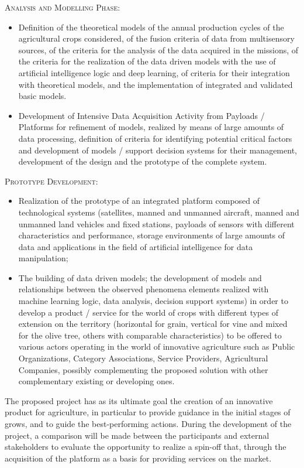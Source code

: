 \documentclass[comsoc,final]{IEEEtran}
\begin{document}
\textsc{Analysis and Modelling Phase:}

\begin{itemize}
\item Definition of the theoretical models of the annual production cycles of the agricultural crops considered, of the fusion criteria of data from multisensory sources, of the criteria for the analysis of the data acquired in the missions, of the criteria for the realization of the data driven models with the use of artificial intelligence logic and deep learning, of criteria for their integration with theoretical models, and the implementation of integrated and validated basic models.
\item Development of Intensive Data Acquisition Activity from Payloads / Platforms for refinement of models, realized by means of large amounts of data processing, definition of criteria for identifying potential critical factors and development of models / support decision systems for their management, development of the design and the prototype of the complete system.
\end{itemize}

\textsc{Prototype Development:}

\begin{itemize}
\item Realization of the prototype of an integrated platform composed of technological systems (satellites, manned and unmanned aircraft, manned and unmanned land vehicles and fixed stations, payloads of sensors with different characteristics and performance, storage environments of large amounts of data and applications in the field of artificial intelligence for data manipulation;
\item The building of data driven models; the development of models and relationships between the observed phenomena elements realized with machine learning logic, data analysis, decision support systems) in order to develop a product / service for the world of crops with different types of extension on the territory (horizontal for grain, vertical for vine and mixed for the olive tree, others with comparable characteristics) to be offered to various actors operating in the world of innovative agriculture such as Public Organizations, Category Associations, Service Providers, Agricultural Companies, possibly complementing the proposed solution with other complementary existing or developing ones.
\end{itemize}

The proposed project has as its ultimate goal the creation of an innovative product for agriculture, in particular to provide guidance in the initial stages of grows, and to guide the best-performing actions. 
During the development of the project, a comparison will be made between the participants and external stakeholders to evaluate the opportunity to realize a spin-off that, through the acquisition of the platform as a basis for providing services on the market.
\end{document}
